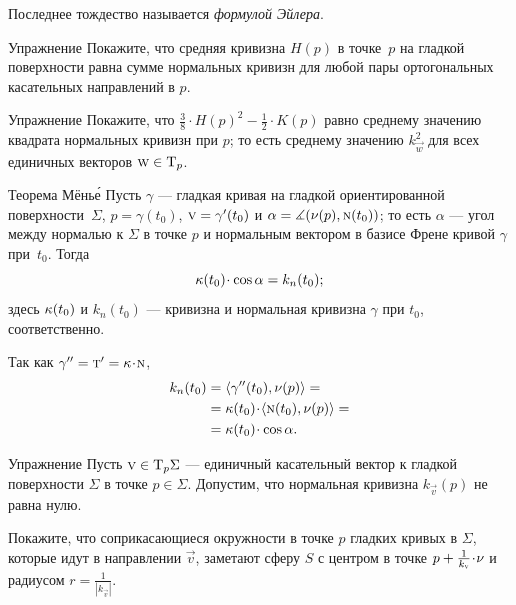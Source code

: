 Последнее тождество называется \emph{формулой Эйлера}.

\begin{thm}{Упражнение}\label{ex:mean-curvature}
Покажите, что средняя кривизна $H(p)$ в точке~$p$ на гладкой поверхности равна сумме нормальных кривизн для любой пары ортогональных касательных направлений в $p$. 
\end{thm}

\begin{thm}{Упражнение}\label{ex:average}
Покажите, что $\tfrac38\cdot H(p)^2-\tfrac12\cdot K(p)$ равно среднему значению квадрата нормальных кривизн при $p$;
то есть среднему значению $k_{\vec w}^2$ для всех единичных векторов ${\text{\sc{w}}}\in\mathrm{T}_p$.
\end{thm}

{\sloppy

\begin{thm}{Теорема Мёнь\'{е}}
\label{thm:meusnier}
Пусть $\gamma$ --- гладкая кривая на гладкой ориентированной поверхности~$\Sigma$, $p=\gamma(t_0)$, ${\vec v}\z=\gamma'(t_0)$ и $\alpha\z=\measuredangle(\Norm(p),\norm(t_0))$;
то есть $\alpha$ --- угол между нормалью к $\Sigma$ в точке $p$ и нормальным вектором в базисе Френе кривой $\gamma$ при~$t_0$.
Тогда 
\[\kur(t_0)\cdot\cos\alpha=k_{n}(t_0);\]
здесь $\kappa(t_0)$ и $k_n(t_0)$ --- кривизна и нормальная кривизна $\gamma$ при $t_0$, соответственно. 
\end{thm}

}

Так как $\gamma''=\tan'=\kur\cdot \norm$, 
\begin{align*}
k_{n}(t_0)&=\langle\gamma''(t_0),\Norm(p)\rangle=
\\
&=\kur(t_0)\cdot\langle\norm(t_0),\Norm(p)\rangle=
\\
&=\kur(t_0)\cdot\cos\alpha.
\end{align*}
\qedsf

\begin{thm}{Упражнение}\label{ex:meusnier}
Пусть ${\vec v}\z\in \T_p\Sigma$ --- единичный касательный вектор к гладкой поверхности $\Sigma$ в точке $p\in\Sigma$.
Допустим, что нормальная кривизна $k_{\vec v}(p)$ не равна нулю.

Покажите, что соприкасающиеся окружности в точке $p$ гладких кривых в $\Sigma$, которые идут в направлении ${\vec v}$, заметают сферу $S$ с центром в точке $p+\tfrac1{k_{\vec v}}\cdot\Norm$ и радиусом $r=\tfrac1{|k_{\vec v}|}$.
\end{thm}




